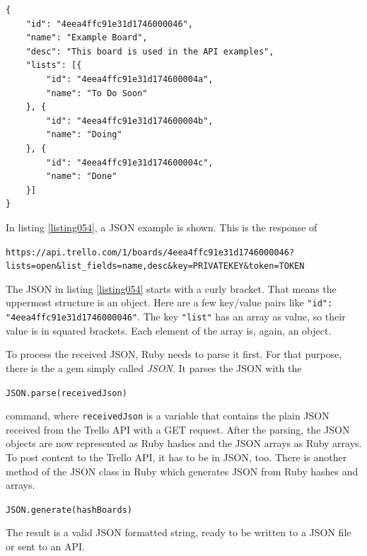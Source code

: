 \begin{lstlisting}[aboveskip=1\baselineskip, caption=JSON example., label=listing054]
{
    "id": "4eea4ffc91e31d1746000046",
    "name": "Example Board",
    "desc": "This board is used in the API examples",
    "lists": [{
        "id": "4eea4ffc91e31d174600004a",
        "name": "To Do Soon"
    }, {
        "id": "4eea4ffc91e31d174600004b",
        "name": "Doing"
    }, {
        "id": "4eea4ffc91e31d174600004c",
        "name": "Done"
    }]
}
\end{lstlisting}

In listing \ref{listing054}, a JSON example is shown. This is the response of

\begin{center}
\texttt{https://api.trello.com/1/boards/4eea4ffc91e31d1746000046? lists=open\&list\_fields=name,desc\&key=PRIVATEKEY\&token=TOKEN}
\end{center}

The JSON in listing \ref{listing054} starts with a curly bracket. That means the uppermost structure is an object. Here are a few key/value pairs like \texttt{"id": "4eea4ffc91e31d1746000046"}. The key \texttt{"list"} has an array as value, so their value is in squared brackets. Each element of the array is, again, an object.

To process the received JSON, Ruby needs to parse it first. For that purpose, there is the a gem simply called \emph{JSON}. It parses the JSON with the 

\begin{center}
\lstinline{JSON.parse(receivedJson)} 
\end{center}
command, where \lstinline{receivedJson} is a variable that contains the plain JSON received from the Trello API with a GET request. After the parsing, the JSON objects are now represented as Ruby hashes and the JSON arrays as Ruby arrays. To post content to the Trello API, it has to be in JSON, too. There is another method of the JSON class in Ruby which generates JSON from Ruby hashes and arrays. 

\begin{center}
\lstinline{JSON.generate(hashBoards)} 
\end{center}

The result is a valid JSON formatted string, ready to be written to a JSON file or sent to an API.